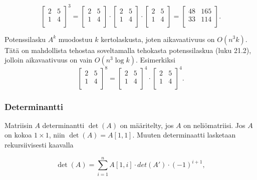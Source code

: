 \[
 \begin{bmatrix}
  2 & 5 \\
  1 & 4 \\
 \end{bmatrix}^3 =
 \begin{bmatrix}
  2 & 5 \\
  1 & 4 \\
 \end{bmatrix} \cdot
 \begin{bmatrix}
  2 & 5 \\
  1 & 4 \\
 \end{bmatrix} \cdot
 \begin{bmatrix}
  2 & 5 \\
  1 & 4 \\
 \end{bmatrix} =
 \begin{bmatrix}
  48 & 165 \\
  33 & 114 \\
 \end{bmatrix}.
\]

Potenssilasku $A^k$ muodostuu $k$ kertolaskusta,
joten aikavaativuus on $O(n^3 k)$.
Tätä on mahdollista tehostaa soveltamalla
tehokasta potenssilaskua (luku 21.2),
jolloin aikavaativuus on vain $O(n^3 \log k)$.
Esimerkiksi
\[
 \begin{bmatrix}
  2 & 5 \\
  1 & 4 \\
 \end{bmatrix}^8 =
 \begin{bmatrix}
  2 & 5 \\
  1 & 4 \\
 \end{bmatrix}^4 \cdot
 \begin{bmatrix}
  2 & 5 \\
  1 & 4 \\
 \end{bmatrix}^4.
\]


\subsubsection{Determinantti}

Matriisin $A$ determinantti $\det(A)$
on määritelty, jos $A$ on neliömatriisi.
Jos $A$ on kokoa $1 \times 1$,
niin $\det(A)=A[1,1]$.
Muuten determinaatti lasketaan rekursiivisesti
kaavalla

\[\det(A)=\sum_{i=1}^n A[1,i] \cdot det(A') \cdot (-1)^{i+1},\]

